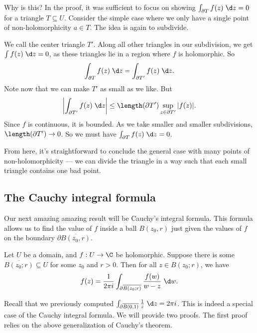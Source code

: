 \documentclass[a4paper]{article}
\begin{document}
Why is this? In the proof, it was sufficient to focus on showing $\int_{\partial T} f(z)\;\d z = 0$ for a triangle $T \subseteq U$. Consider the simple case where we only have a single point of non-holomorphicity $a \in T$. The idea is again to subdivide.
\begin{center}
\end{center}
We call the center triangle $T'$. Along all other triangles in our subdivision, we get $\int f(z)\;\d z = 0$, as these triangles lie in a region where $f$ is holomorphic. So
\[
  \int_{\partial T} f(z)\;\d z = \int_{\partial T'} f(z)\;\d z.
\]
Note now that we can make $T'$ as small as we like. But
\[
  \left|\int_{\partial T'} f(z)\;\d z\right| \leq \length(\partial T') \sup_{z \in \partial T'} |f(z)|.
\]
Since $f$ is continuous, it is bounded. As we take smaller and smaller subdivisions, $\length(\partial T') \to 0$. So we must have $\int_{\partial T} f(z)\;\d z = 0$.

From here, it's straightforward to conclude the general case with many points of non-holomorphicity --- we can divide the triangle in a way such that each small triangle contains one bad point.

\subsection{The Cauchy integral formula}
Our next amazing amazing result will be Cauchy's integral formula. This formula allows us to find the value of $f$ inside a ball $B(z_0, r)$ just given the values of $f$ on the boundary $\partial \overline{B(z_0, r)}$.

\begin{thm}
  Let $U$ be a domain, and $f: U \to \C$ be holomorphic. Suppose there is some $\overline{B(z_0; r)} \subseteq U$ for some $z_0$ and $r > 0$. Then for all $z \in B(z_0; r)$, we have
  \[
    f(z) = \frac{1}{2\pi i} \int_{\partial \overline{B(z_0; r)}} \frac{f(w)}{w - z}\;\d w.
  \]
\end{thm}
Recall that we previously computed $\int_{\partial \overline{B(0, 1)}} \frac{1}{z} \;\d z= 2\pi i$. This is indeed a special case of the Cauchy integral formula. We will provide two proofs. The first proof relies on the above generalization of Cauchy's theorem.
\end{document}
